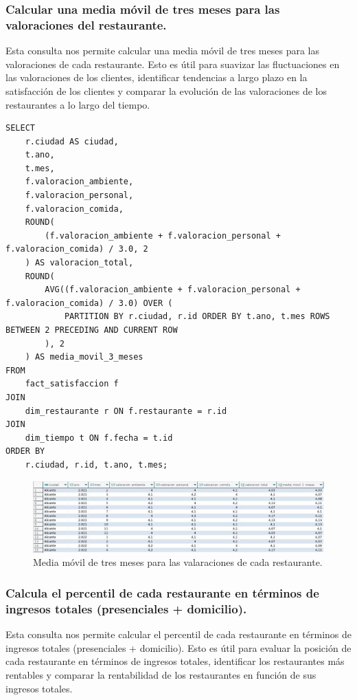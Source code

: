 \documentclass[11pt]{opticajnl}
\begin{document}
\subsubsection{Calcular una media móvil de tres meses para las valoraciones del restaurante.}

Esta consulta nos permite calcular una media móvil de tres meses para las valoraciones de cada restaurante. Esto es útil para suavizar las fluctuaciones en las valoraciones de los clientes, identificar tendencias a largo plazo en la satisfacción de los clientes y comparar la evolución de las valoraciones de los restaurantes a lo largo del tiempo.

\begin{lstlisting}[style=terminal]
SELECT 
    r.ciudad AS ciudad,
    t.ano,
    t.mes,
    f.valoracion_ambiente,
    f.valoracion_personal,
    f.valoracion_comida,
    ROUND(
        (f.valoracion_ambiente + f.valoracion_personal + f.valoracion_comida) / 3.0, 2
    ) AS valoracion_total,
    ROUND(
        AVG((f.valoracion_ambiente + f.valoracion_personal + f.valoracion_comida) / 3.0) OVER (
            PARTITION BY r.ciudad, r.id ORDER BY t.ano, t.mes ROWS BETWEEN 2 PRECEDING AND CURRENT ROW
        ), 2
    ) AS media_movil_3_meses
FROM 
    fact_satisfaccion f
JOIN 
    dim_restaurante r ON f.restaurante = r.id
JOIN 
    dim_tiempo t ON f.fecha = t.id
ORDER BY 
    r.ciudad, r.id, t.ano, t.mes;
\end{lstlisting}

\begin{figure}[H]
    \centering
    \includegraphics[width=\textwidth]{fotos/q4.jpg}
    \caption{Media móvil de tres meses para las valaraciones de cada restaurante.}
    \label{fig:rolap3}
\end{figure}


\subsubsection{Calcula el percentil de cada restaurante en términos de ingresos totales (presenciales + domicilio).}

Esta consulta nos permite calcular el percentil de cada restaurante en términos de ingresos totales (presenciales + domicilio). Esto es útil para evaluar la posición de cada restaurante en términos de ingresos totales, identificar los restaurantes más rentables y comparar la rentabilidad de los restaurantes en función de sus ingresos totales.
\end{document}
